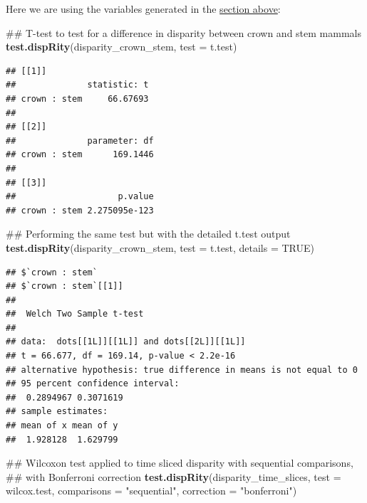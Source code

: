 \documentclass[]{book}
\newenvironment{Shaded}{\begin{snugshade}}{\end{snugshade}}
\newcommand{\KeywordTok}[1]{\textcolor[rgb]{0.13,0.29,0.53}{\textbf{#1}}}
\newcommand{\DataTypeTok}[1]{\textcolor[rgb]{0.13,0.29,0.53}{#1}}
\newcommand{\StringTok}[1]{\textcolor[rgb]{0.31,0.60,0.02}{#1}}
\newcommand{\OtherTok}[1]{\textcolor[rgb]{0.56,0.35,0.01}{#1}}
\newcommand{\NormalTok}[1]{#1}
\theoremstyle{definition}
\theoremstyle{definition}
\theoremstyle{remark}
\begin{document}
Here we are using the variables generated in the
\protect\hyperlink{summarising-dispRity-data-plots}{section above}:

\begin{Shaded}
\begin{Highlighting}[]
\NormalTok{## T-test to test for a difference in disparity between crown and stem mammals}
\KeywordTok{test.dispRity}\NormalTok{(disparity_crown_stem, }\DataTypeTok{test =}\NormalTok{ t.test)}
\end{Highlighting}
\end{Shaded}

\begin{verbatim}
## [[1]]
##              statistic: t
## crown : stem     66.67693
## 
## [[2]]
##              parameter: df
## crown : stem      169.1446
## 
## [[3]]
##                    p.value
## crown : stem 2.275095e-123
\end{verbatim}

\begin{Shaded}
\begin{Highlighting}[]
\NormalTok{## Performing the same test but with the detailed t.test output}
\KeywordTok{test.dispRity}\NormalTok{(disparity_crown_stem, }\DataTypeTok{test =}\NormalTok{ t.test, }\DataTypeTok{details =} \OtherTok{TRUE}\NormalTok{)}
\end{Highlighting}
\end{Shaded}

\begin{verbatim}
## $`crown : stem`
## $`crown : stem`[[1]]
## 
##  Welch Two Sample t-test
## 
## data:  dots[[1L]][[1L]] and dots[[2L]][[1L]]
## t = 66.677, df = 169.14, p-value < 2.2e-16
## alternative hypothesis: true difference in means is not equal to 0
## 95 percent confidence interval:
##  0.2894967 0.3071619
## sample estimates:
## mean of x mean of y 
##  1.928128  1.629799
\end{verbatim}

\begin{Shaded}
\begin{Highlighting}[]
\NormalTok{## Wilcoxon test applied to time sliced disparity with sequential comparisons,}
\NormalTok{## with Bonferroni correction}
\KeywordTok{test.dispRity}\NormalTok{(disparity_time_slices, }\DataTypeTok{test =}\NormalTok{ wilcox.test,}
              \DataTypeTok{comparisons =} \StringTok{"sequential"}\NormalTok{, }\DataTypeTok{correction =} \StringTok{"bonferroni"}\NormalTok{)}
\end{Highlighting}
\end{Shaded}
\end{document}
